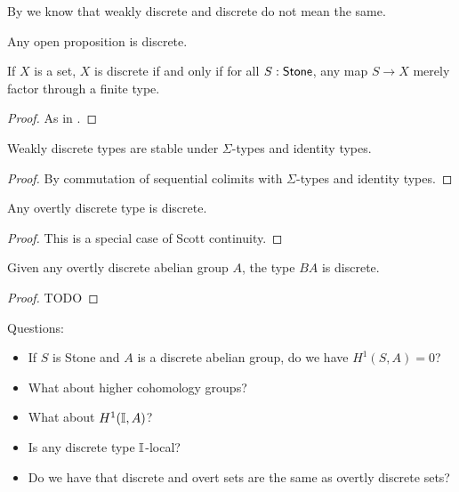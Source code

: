 By  we know that weakly discrete and discrete do not mean the same.

\begin{corollary}
Any open proposition is discrete.
\end{corollary}

\begin{lemma}
If $X$ is a set, $X$ is discrete if and only if for all $S:\mathsf{Stone}$, any map $S\to X$ merely factor through a finite type.
\end{lemma}

\begin{proof}
As in .
\end{proof}

\begin{lemma}
Weakly discrete types are stable under $\Sigma$-types and identity types.
\end{lemma}

\begin{proof}
By commutation of sequential colimits with $\Sigma$-types and identity types.
\end{proof}

\begin{lemma}
Any overtly discrete type is discrete.
\end{lemma}

\begin{proof}
This is a special case of Scott continuity.
\end{proof}

\begin{lemma}
Given any overtly discrete abelian group $A$, the type $BA$ is discrete.
\end{lemma}

\begin{proof}
TODO 
\end{proof}

Questions:
\begin{itemize}
\item If $S$ is Stone and $A$ is a discrete abelian group, do we have $H^1(S,A) = 0$? 
\item What about higher cohomology groups? 
\item What about $H^1(\mathbb{I},A)$? 
\item Is any discrete type $\mathbb{I}$-local? 
\item Do we have that discrete and overt sets are the same as overtly discrete sets?
\end{itemize}